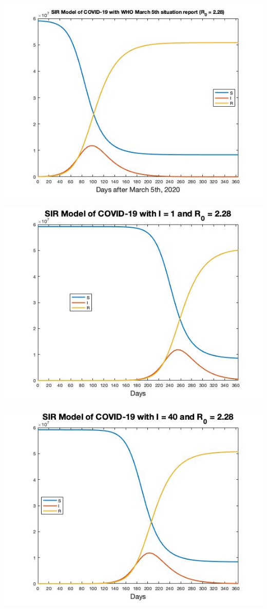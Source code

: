 \documentclass[12pt, a4paper]{article}
\begin{document}
        \includegraphics[scale=0.75]{plots/whosir228.jpg}
        
        \includegraphics[scale=0.75]{plots/infect1_2.28.jpg}
        
        \includegraphics[scale=0.75]{plots/infect40_2.28.jpg}
\end{document}

